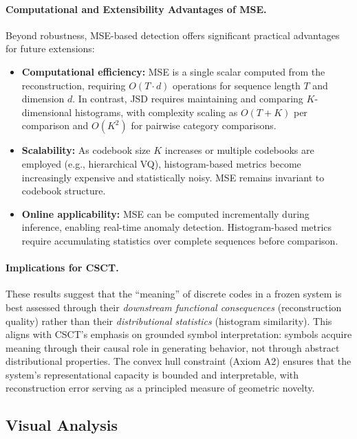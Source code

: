 \documentclass{article}
\begin{document}
\paragraph{Computational and Extensibility Advantages of MSE.}
Beyond robustness, MSE-based detection offers significant practical advantages for future extensions:
\begin{itemize}
    \item \textbf{Computational efficiency:} MSE is a single scalar computed from the reconstruction, requiring $O(T \cdot d)$ operations for sequence length $T$ and dimension $d$. In contrast, JSD requires maintaining and comparing $K$-dimensional histograms, with complexity scaling as $O(T + K)$ per comparison and $O(K^2)$ for pairwise category comparisons.
    \item \textbf{Scalability:} As codebook size $K$ increases or multiple codebooks are employed (e.g., hierarchical VQ), histogram-based metrics become increasingly expensive and statistically noisy. MSE remains invariant to codebook structure.
    \item \textbf{Online applicability:} MSE can be computed incrementally during inference, enabling real-time anomaly detection. Histogram-based metrics require accumulating statistics over complete sequences before comparison.
\end{itemize}

\paragraph{Implications for CSCT.}
These results suggest that the ``meaning'' of discrete codes in a frozen system is best assessed through their \emph{downstream functional consequences} (reconstruction quality) rather than their \emph{distributional statistics} (histogram similarity).
This aligns with CSCT's emphasis on grounded symbol interpretation: symbols acquire meaning through their causal role in generating behavior, not through abstract distributional properties.
The convex hull constraint (Axiom A2) ensures that the system's representational capacity is bounded and interpretable, with reconstruction error serving as a principled measure of geometric novelty.

\subsection{Visual Analysis}
\end{document}
